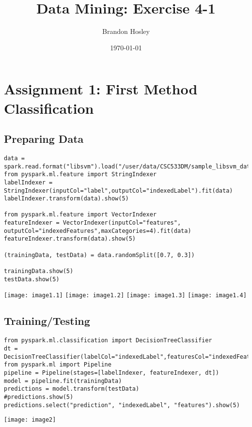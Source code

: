 \documentclass[]{article}
\title{Data Mining: Exercise 4-1}
\author{Brandon Hosley}
\date{\today}
\begin{document}
\maketitle

\section*{Assignment 1: First Method Classification}

\subsection*{Preparing Data}
\begin{verbatim}
data = spark.read.format("libsvm").load("/user/data/CSC533DM/sample_libsvm_data.txt")
from pyspark.ml.feature import StringIndexer
labelIndexer = StringIndexer(inputCol="label",outputCol="indexedLabel").fit(data)
labelIndexer.transform(data).show(5)

from pyspark.ml.feature import VectorIndexer
featureIndexer = VectorIndexer(inputCol="features", outputCol="indexedFeatures",maxCategories=4).fit(data)
featureIndexer.transform(data).show(5)

(trainingData, testData) = data.randomSplit([0.7, 0.3])

trainingData.show(5)
testData.show(5)
\end{verbatim}
\texttt{[image: image1.1]}
\texttt{[image: image1.2]}
\texttt{[image: image1.3]}
\texttt{[image: image1.4]}

\subsection*{Training/Testing}
\begin{verbatim}
from pyspark.ml.classification import DecisionTreeClassifier
dt = DecisionTreeClassifier(labelCol="indexedLabel",featuresCol="indexedFeatures")
from pyspark.ml import Pipeline
pipeline = Pipeline(stages=[labelIndexer, featureIndexer, dt])
model = pipeline.fit(trainingData)
predictions = model.transform(testData)
#predictions.show(5)
predictions.select("prediction", "indexedLabel", "features").show(5)
\end{verbatim}
\texttt{[image: image2]}
\end{document}
